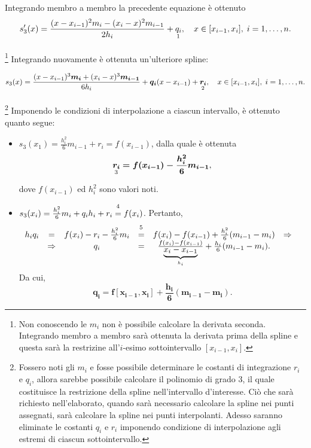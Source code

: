 Integrando membro a membro la precedente equazione è ottenuto
\begin{equation}\label{eq:s'_3(x)}
    s'_3(x)=\frac{(x-x_{i-1})^2m_i-(x_i-x)^2m_{i-1}}{2h_i}+\underset{\footnotemark}{q_i},\quad x\in [x_{i-1}, x_i],\; i=1,\hdots,n.
\end{equation}

\noindent\footnote{Non conoscendo le $m_i$ non è possibile calcolare la derivata seconda. Integrando membro a membro sarà ottenuta la derivata prima della spline e questa sarà la restrizine all'$i$-esimo sottointervallo $[x_{i-1},x_i]$.}
Integrando nuovamente è ottenuta un'ulteriore spline:

\begin{equation}\label{eq:s3Ign}
    s_3(x)=\frac{(x-x_{i-1})^3\boldsymbol{m_i}+(x_i-x)^3\boldsymbol{m_{i-1}}}{6h_i}+\boldsymbol{q_i}(x-x_{i-1})+\underset{\footnotemark}{\boldsymbol{r_i}},\quad x\in[x_{i-1},x_i],\; i=1,\hdots,n.
\end{equation}

\noindent\footnote{Fossero noti gli $m_i$ e fosse possibile determinare le costanti di integrazione $r_i$ e $q_i$, allora sarebbe possibile calcolare il polinomio di grado 3, il quale costituisce la restrizione della spline nell'intervallo d'interesse. Ciò che sarà richiesto nell'elaborato, quando sarà necessario calcolare la spline nei punti assegnati, sarà calcolare la spline nei punti interpolanti. Adesso saranno eliminate le costanti $q_i$ e $r_i$ imponendo condizione di interpolazione agli estremi di ciascun sottointervallo.}
Imponendo le condizioni di interpolazione a ciascun intervallo, è ottenuto quanto segue:
\begin{itemize}
    \item $s_3(x_1)=\frac{h_i^2}{6}m_{i-1}+r_i=f(x_{i-1})$, dalla quale è ottenuta \begin{equation}\label{eq:ri}
        \underset{\footnotemark}{\boldsymbol{r_i}}\boldsymbol{=f(x_{i-1})-\frac{h_i^2}{6}m_{i-1}},
    \end{equation}
    dove $f(x_{i-1})$ ed $h_i^2$ sono valori noti.
    \item $s_3(x_i)=\frac{h_i^2}{6}m_i+q_ih_i+r_i\overset{\footnotemark}{=}f(x_i)$. Pertanto,
    \begin{equation*}
        \begin{matrix}
             h_iq_i &=& f(x_i)-r_i-\frac{h_i^2}{6}m_i &\overset{\footnotemark}{=}& f(x_i)-f(x_{i-1})+\frac{h_i^2}{6}(m_{i-1}-m_i) &\Rightarrow&\\
            &\Rightarrow& q_i &=& \frac{f(x_i)-f(x_{i-1})}{\underbrace{x_i-x_{i-1}}_{h_i}}+\frac{h_i}{6}(m_{i-1}-m_i).&&
        \end{matrix}
    \end{equation*}
    Da cui,
    \begin{equation}\label{eq:qi}
        \boldsymbol{q_i=f[x_{i-1},x_i]+\frac{h_i}{6}(m_{i-1}-m_i).}
    \end{equation}
\end{itemize}
\addtocounter{footnote}{-2}

